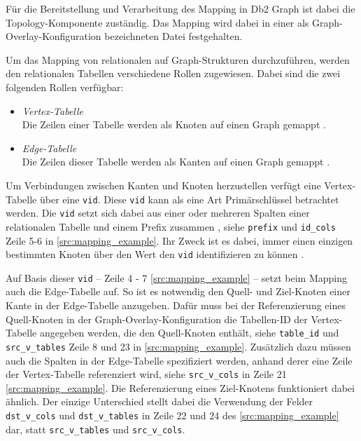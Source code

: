 Für die Bereitstellung und Verarbeitung des Mapping in Db2 Graph ist dabei die Topology-Komponente zuständig. Das Mapping wird dabei in einer als Graph-Overlay-Konfiguration bezeichneten Datei festgehalten.  

Um das Mapping von relationalen auf Graph-Strukturen durchzuführen, werden den relationalen Tabellen verschiedene Rollen zugewiesen. Dabei sind die zwei folgenden Rollen verfügbar:
\begin{itemize}
    \item \textit{Vertex-Tabelle}\\Die Zeilen einer Tabelle werden als Knoten auf einen Graph gemappt \cite{sigmod_tian, yt_tian}.
    \item \textit{Edge-Tabelle}\\Die Zeilen dieser Tabelle werden als Kanten auf einen Graph gemappt \cite{sigmod_tian, yt_tian}.
\end{itemize}

Um Verbindungen zwischen Kanten und Knoten herzustellen  verfügt eine Vertex-Tabelle über eine \texttt{vid}. Diese \texttt{vid} kann als eine Art Primärschlüssel betrachtet werden. Die \texttt{vid} setzt sich dabei aus einer oder mehreren Spalten einer relationalen Tabelle und einem Prefix zusammen \cite{sigmod_tian, yt_tian}, siehe \texttt{prefix} und \texttt{id\_cols} Zeile 5-6 in \autoref{src:mapping_example}. Ihr Zweck ist es dabei, immer einen einzigen bestimmten Knoten über den Wert den \texttt{vid} identifizieren zu können \cite{sigmod_tian, yt_tian}. 

Auf Basis dieser \texttt{vid} -- Zeile 4 - 7 \autoref{src:mapping_example} -- setzt beim Mapping auch die Edge-Tabelle auf. So ist es notwendig den Quell- und Ziel-Knoten einer Kante in der Edge-Tabelle anzugeben. Dafür muss bei der Referenzierung eines Quell-Knoten in der Graph-Overlay-Konfiguration die Tabellen-ID der Vertex-Tabelle angegeben werden, die den Quell-Knoten enthält, siehe \texttt{table\_id} und \texttt{src\_v\_tables} Zeile 8 und 23 in \autoref{src:mapping_example}. Zusätzlich dazu müssen auch die Spalten in der Edge-Tabelle spezifiziert werden, anhand derer eine Zeile der Vertex-Tabelle referenziert wird, siehe \texttt{src\_v\_cols} in Zeile 21 \autoref{src:mapping_example}. Die Referenzierung eines Ziel-Knotens funktioniert dabei ähnlich. Der einzige Unterschied stellt dabei die Verwendung der Felder \texttt{dst\_v\_cols} und \texttt{dst\_v\_tables} in Zeile 22 und 24 des \autoref{src:mapping_example} dar, statt \texttt{src\_v\_tables} und \texttt{src\_v\_cols}.

